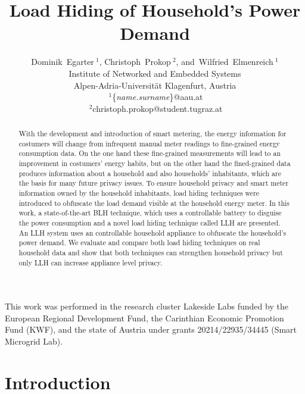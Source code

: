 \documentclass{article}
\makeatletter
\def\blfootnote{
 \xdef\@thefnmark{}\@footnotetext
 }
\makeatother
\begin{document}
	\setlength{\baselineskip}{.965\baselineskip}



\title{Load Hiding of Household's Power Demand}

 \author{
Dominik~Egarter{\small $~^{1}$}, Christoph~Prokop{\small $~^{2}$}, and~Wilfried~Elmenreich{\small $~^{1}$}\\
Institute of Networked and Embedded Systems\\
 Alpen-Adria-Universit\"at Klagenfurt, Austria\\
 {\small $~^{1}$}\{\emph{name.surname}\}@aau.at\\
 {\small $~^{2}$}christoph.prokop@student.tugraz.at
 }

\maketitle              \blfootnote{ 
This work was performed in the research cluster Lakeside Labs funded by the European Regional Development Fund, the Carinthian Economic Promotion Fund (KWF), and the state of Austria under grants 20214/22935/34445 (Smart Microgrid Lab).
}
\begin{abstract}
With the development and introduction of smart metering, the energy information for costumers will change from infrequent manual meter readings to fine-grained energy consumption data. 
On the one hand these fine-grained measurements will lead to an improvement in costumers' energy habits, but on the other hand the fined-grained data produces information about a household and also households' inhabitants, which are the basis for many future privacy issues.
To ensure household privacy and smart meter information owned by the household inhabitants,  load hiding techniques were introduced to obfuscate the load demand visible at the household energy meter.
In this work, a state-of-the-art \ac{BLH} technique, which uses a controllable battery to disguise the power consumption and a novel load hiding technique called \ac{LLH} are presented. 
An \ac{LLH} system uses an controllable household appliance to obfuscate the household's power demand.
We evaluate and compare both load hiding techniques on real household data and show that both techniques can strengthen household privacy but only \ac{LLH} can increase appliance level privacy.
\end{abstract}
\section{Introduction}
\end{document}
